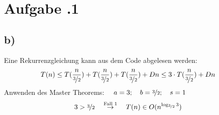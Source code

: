 \newpage
\section*{Aufgabe \bn.1}
\subsection*{b)}
Eine Rekurrenzgleichung kann aus dem Code abgelesen werden:
\begin{align*}
  T(n) \le T(\frac{ n }{ \nicefrac{ 3 }{ 2 } } ) + T(\frac{ n }{ \nicefrac{ 3 }{ 2 } } ) + T(\frac{ n }{ \nicefrac{ 3 }{ 2 } } ) + Dn \le 3\cdot T(\frac{ n }{ \nicefrac{ 3 }{ 2 } } )+ Dn
\end{align*}
Anwenden des Master Theorems: $\quad a=3;\quad b=\nicefrac{3}{2}; \quad s=1 $
\begin{align*}
  3>\nicefrac{3}{2} \quad\overset{\text{Fall 1}}{\rightarrow }\quad T(n)\in O(n ^{ \log_{\nicefrac{3}{2}}3 } )
\end{align*}